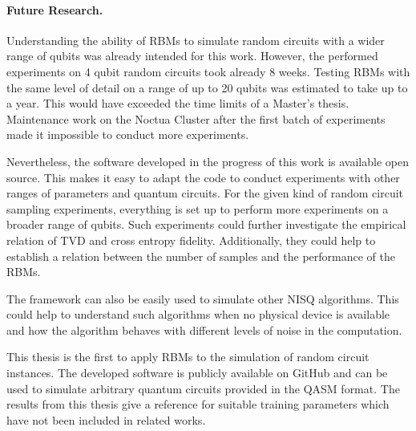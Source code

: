 \paragraph{Future Research.}
Understanding the ability of RBMs to simulate random circuits with a wider range of qubits 
was already intended for this work. However, the performed experiments 
on 4 qubit random circuits took already 8 weeks. Testing RBMs with the same 
level of detail on a range of up to 20 qubits was estimated to take up to 
a year. This would have exceeded the time limits of a Master's thesis. Maintenance work on the Noctua Cluster 
after the first batch of experiments made it impossible to conduct more experiments.

Nevertheless, the software developed in the progress of this work is available open source. 
This makes it easy to adapt the code to conduct experiments 
with other ranges of parameters and quantum circuits. For the given kind of random circuit 
sampling experiments, everything is set up to perform more experiments on a broader range of 
qubits. Such experiments could further investigate the empirical relation of TVD and cross entropy 
fidelity. Additionally, they could help to establish a relation between the number of samples and 
the performance of the RBMs.

The framework can also be easily used to simulate other NISQ algorithms. This could help to 
understand such algorithms when no physical device is available and how the algorithm
behaves with different levels of noise in the computation.

This thesis is the first to apply RBMs to the simulation of random circuit instances. 
The developed software is publicly available on GitHub and can be used to simulate arbitrary quantum 
circuits provided in the QASM format. The results from 
this thesis give a reference for suitable training parameters which have not been included in related works.


